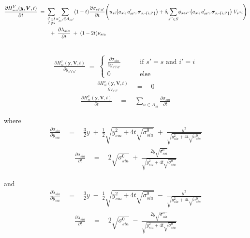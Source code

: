 \documentclass[11pt,fleqn]{article}
\newcommand{\bsigma}{\bm{\sigma}}
\newcommand{\bV}{\bm{V}}
\newcommand{\by}{\bm{y}}
\newcommand{\shortminus}{{\text{\scalebox{0.4}[1.0]{\(-\)}}}}
\newcommand{\shortrightarrow}{\parbox{4pt}{\tikz{\draw[->](0,0)--(4pt,0);}}}
\begin{document}
\begin{align*}
	\frac{\partial H^V_{sia}(\by,\bV,t) }{ \partial t } & \;=\; 
	\sum\limits_{\substack{i'\in I \\ i'\neq i}} \sum\limits_{a_{si'}'\in A_{si'}} (1-t) \frac{\partial\sigma_{si'a'}}{\partial t} \Biggl( u_{si}\bigl(a_{si},a_{si'}',\bsigma_{s,\shortminus\{i,i'\}}\bigr) + \delta_i \sum\limits_{\mathclap{s''\in S}} \phi_{s\shortrightarrow s''}\bigl(a_{si},a_{si'}',\bsigma_{s,\shortminus\{i,i'\}}\bigr) \; V_{s''i} \Biggr) \\
	& \qquad \;+\; \frac{\partial\lambda_{sia}}{\partial t} \;+\; (1-2t) \nu_{sia} \\
	& 
\end{align*}

\begin{align*}
	\frac{ \partial H^\sigma_{si}(\by,\bV,t) }{ \partial y_{s'i'a'}} \;=\; 
	\begin{cases}
		\frac{\partial\sigma_{sia}}{\partial y_{s'i'a'} } \qquad&\text{if } s'=s \text{ and } i'=i \\
		0 \qquad&\text{else}  
	\end{cases}
\end{align*}
\begin{align*}
	\frac{ \partial H^\sigma_{si}(\by,\bV,t) }{ \partial V_{s'i'} } \quad=\quad 0
\end{align*}
\begin{align*}
	\frac{ \partial H^\sigma_{si}(\by,\bV,t) }{ \partial t } \quad=\quad \sum\limits_{a\in A_{si}} \frac{\partial\sigma_{sia}}{\partial t}
\end{align*}

where
\begin{align*}
	\frac{\partial\sigma_{sia}}{\partial y_{sia}} \quad=\quad \frac{3}{2} y \;+\; \frac{1}{2} \sqrt{y_{sia}^2+4t\sqrt{\sigma^0_{sia}}} \;+\; \frac{y^2}{\sqrt{y_{sia}^2+4t\sqrt{\sigma^0_{sia}}}}
\end{align*}
\begin{align*}
	\frac{\partial\sigma_{sia}}{\partial t} \quad=\quad 2\sqrt{\sigma^0_{sia}} \;+\; \frac{2y\sqrt{\sigma^0_{sia}}}{\sqrt{y_{sia}^2+4t\sqrt{\sigma^0_{sia}}}}
\end{align*}

and
\begin{align*}
	\frac{\partial\lambda_{sia}}{\partial y_{sia}} \quad=\quad \frac{3}{2} y \;-\; \frac{1}{2} \sqrt{y_{sia}^2+4t\sqrt{\sigma^0_{sia}}} \;-\; \frac{y^2}{\sqrt{y_{sia}^2+4t\sqrt{\sigma^0_{sia}}}}
\end{align*}
\begin{align*}
	\frac{\partial\lambda_{sia}}{\partial t} \quad=\quad 2\sqrt{\sigma^0_{sia}} \;-\; \frac{2y\sqrt{\sigma^0_{sia}}}{\sqrt{y_{sia}^2+4t\sqrt{\sigma^0_{sia}}}}
\end{align*}
\end{document}
